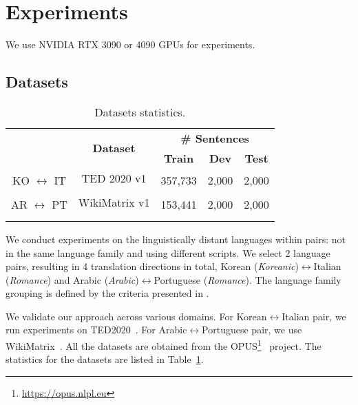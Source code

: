 \section{Experiments}

We use NVIDIA RTX 3090 or 4090 GPUs for experiments.


\subsection{Datasets}
\label{sec:datasets}


\begin{table}[h!]
\centering
\begin{adjustbox}{width=\columnwidth, center}
\renewcommand{\arraystretch}{0.9}
\begin{tabular}{ccccc}
\Xhline{3\arrayrulewidth}
\multirow{2}{*}{\textbf{Lang-pair}} & \multirow{2}{*}{\textbf{Dataset}} & \multicolumn{3}{c}{\textbf{\# Sentences}} \\ \cline{3-5} 
 & & \textbf{Train} & \textbf{Dev} & \textbf{Test} \\ \hline\hline 
\multirow{2}{*}{KO $\leftrightarrow$ IT} & TED 2020 v1& \multirow{2}{*}{357,733} & \multirow{2}{*}{2,000} & \multirow{2}{*}{2,000} \\
 & \cite{ted2020} & & & \\ \hline  
\multirow{2}{*}{AR $\leftrightarrow$ PT} & WikiMatrix v1& \multirow{2}{*}{153,441} & \multirow{2}{*}{2,000} & \multirow{2}{*}{2,000} \\
 & \cite{schwenk2019wikimatrix}& & & \\
\Xhline{3\arrayrulewidth}
\end{tabular}
\end{adjustbox}
\caption{Datasets statistics.}
\label{tab:dataset statistics}
\end{table}


We conduct experiments on the linguistically distant languages within pairs: not in the same language family and using different scripts.
We select 2 language pairs, resulting in 4 translation directions in total, Korean (\textit{Koreanic})$\leftrightarrow$Italian (\textit{Romance}) and Arabic (\textit{Arabic})$\leftrightarrow$Portuguese (\textit{Romance}).
The language family grouping is defined by the criteria presented in \citet{m2m100}.


We validate our approach across various domains.
For Korean$\leftrightarrow$Italian pair, we run experiments on TED2020~\cite{ted2020}.
For Arabic$\leftrightarrow$Portuguese pair, we use WikiMatrix~\cite{schwenk2019wikimatrix}.
All the datasets are obtained from the OPUS\footnote{\url{https://opus.nlpl.eu}}~\cite{opus} project.
The statistics for the datasets are listed in Table~\ref{tab:dataset statistics}.




